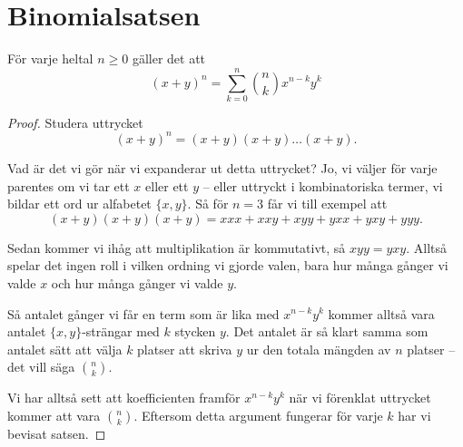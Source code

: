 \documentclass[nobib]{tufte-handout}
\begin{document}
\section{Binomialsatsen}

\begin{theorem}[Binomialsatsen]
  För varje heltal $n\geq 0$ gäller det att
  $$(x + y)^n = \sum_{k=0}^n \binom{n}{k}x^{n-k}y^k$$
  \begin{proof}
    Studera uttrycket
    $$(x + y)^n = (x + y)(x + y)\ldots(x + y).$$

    Vad är det vi gör när vi expanderar ut detta uttrycket? Jo, vi väljer för varje parentes om vi tar ett $x$ eller ett $y$ -- eller uttryckt i kombinatoriska termer, vi bildar ett ord ur alfabetet $\{x, y\}$. Så för $n = 3$ får vi till exempel att
    $$(x+y)(x+y)(x+y) = xxx + xxy + xyy + yxx + yxy + yyy.$$

    Sedan kommer vi ihåg att multiplikation är kommutativt, så $xyy = yxy$. Alltså spelar det ingen roll i vilken ordning vi gjorde valen, bara hur många gånger vi valde $x$ och hur många gånger vi valde $y$.

    Så antalet gånger vi får en term som är lika med $x^{n-k}y^k$ kommer alltså vara antalet $\{x, y\}$-strängar med $k$ stycken $y$. Det antalet är så klart samma som antalet sätt att välja $k$ platser att skriva $y$ ur den totala mängden av $n$ platser -- det vill säga $\binom{n}{k}$.

    Vi har alltså sett att koefficienten framför $x^{n-k}y^k$ när vi förenklat uttrycket kommer att vara $\binom{n}{k}$. Eftersom detta argument fungerar för varje $k$ har vi bevisat satsen.
  \end{proof}
\end{theorem}
\end{document}
